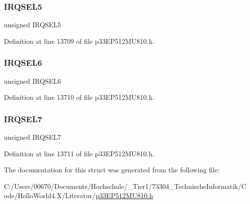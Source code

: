 \subsubsection{\texorpdfstring{I\+R\+Q\+S\+E\+L5}{IRQSEL5}}
{\footnotesize\ttfamily unsigned I\+R\+Q\+S\+E\+L5}



Definition at line 13709 of file p33\+E\+P512\+M\+U810.\+h.

\mbox{\label{structtag_d_m_a14_r_e_q_b_i_t_s_ace52408ef8c29561f3c56a3fbcbc8217}} 
\subsubsection{\texorpdfstring{I\+R\+Q\+S\+E\+L6}{IRQSEL6}}
{\footnotesize\ttfamily unsigned I\+R\+Q\+S\+E\+L6}



Definition at line 13710 of file p33\+E\+P512\+M\+U810.\+h.

\mbox{\label{structtag_d_m_a14_r_e_q_b_i_t_s_acce7dedecdf1f53cdbead3edf7c5d53a}} 
\subsubsection{\texorpdfstring{I\+R\+Q\+S\+E\+L7}{IRQSEL7}}
{\footnotesize\ttfamily unsigned I\+R\+Q\+S\+E\+L7}



Definition at line 13711 of file p33\+E\+P512\+M\+U810.\+h.



The documentation for this struct was generated from the following file\+:\begin{DoxyCompactItemize}
\item 
C\+:/\+Users/00670/\+Documents/\+Hochschule/\+\_\+\+Tier1/73304\+\_\+\+Technische\+Informatik/\+Code/\+Hello\+World4.\+X/\+Literatur/\hyperlink{p33_e_p512_m_u810_8h}{p33\+E\+P512\+M\+U810.\+h}\end{DoxyCompactItemize}

